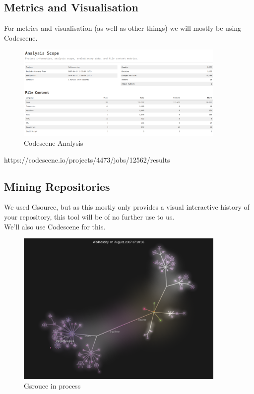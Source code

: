 \documentclass{article}
\begin{document}
\subsection{Metrics and Visualisation}

For metrics and visualisation (as well as other things) we will mostly be using Codescene.

\begin{figure}[H]
\centering
	\includegraphics[width=0.9\textwidth]{codescene_analysis.png}
	\caption{Codescene Analysis}
\end{figure}

https://codescene.io/projects/4473/jobs/12562/results

\subsection{Mining Repositories}

We used Gsource, but as this mostly only provides a visual interactive history of your repository, this tool will be of no further use to us.\\

\noindent
We'll also use Codescene for this.


\begin{figure}[H]
\centering
	\includegraphics[width=0.9\textwidth]{gsource.png}
	\caption{Gsrouce in process}
\end{figure}
\end{document}
